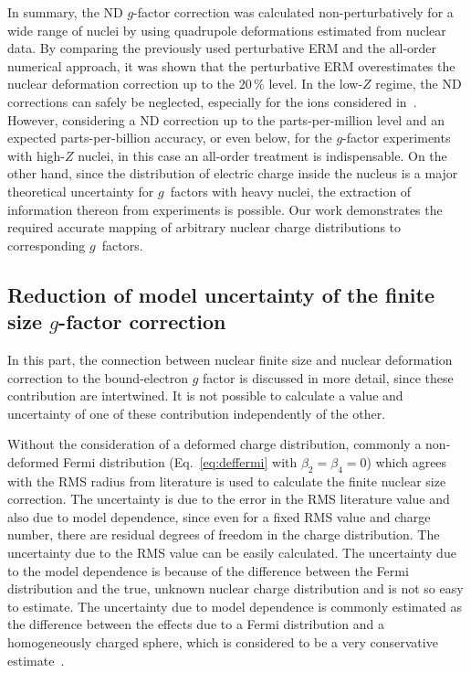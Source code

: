 In summary, the ND $g$-factor correction was calculated non-perturbatively for a wide range of nuclei by using quadrupole deformations estimated from nuclear data.
By comparing the previously used perturbative ERM and the all-order numerical approach, it was shown that the perturbative ERM overestimates the nuclear deformation correction up to the $20\,\%$ level.
In the low-$Z$ regime, the ND corrections can safely be neglected, especially for the ions considered in~\cite{Sturm2014}. However, considering a ND correction up to the parts-per-million level and an expected parts-per-billion accuracy, or even below, for the $g$-factor experiments with high-$Z$ nuclei, in this case an all-order treatment is indispensable. 
On the other hand, since the distribution of electric charge inside the nucleus is a major theoretical uncertainty for $g$~factors with heavy nuclei, the extraction of information thereon from experiments is possible. Our work demonstrates the required accurate mapping of arbitrary nuclear charge distributions to corresponding $g$~factors.\\[0.6cm]

\subsection{Reduction of model uncertainty of the finite size $g$-factor correction}
In this part, the connection between nuclear finite size and nuclear deformation correction to the bound-electron $g$ factor is discussed in more detail, since these contribution are intertwined. It is not possible to calculate a value and uncertainty of one of these contribution independently of the other.

Without the consideration of a deformed charge distribution, commonly a non-deformed Fermi distribution (Eq.~\eqref{eq:deffermi} with ${\beta_2}{=}{\beta_4}{=}0$) which agrees with the RMS radius from literature is used to calculate the finite nuclear size correction. 
The uncertainty is due to the error in the RMS literature value and also due to model dependence, since even for a fixed RMS value and charge number, there are residual degrees of freedom in the charge distribution. The uncertainty due to the RMS value can be easily calculated. The uncertainty due to the model dependence is because of the difference between the Fermi distribution and the true, unknown nuclear charge distribution and is not so easy to estimate. The uncertainty due to model dependence is commonly estimated as the difference between the effects due to a Fermi distribution and a homogeneously charged sphere, which is considered to be a very conservative estimate~\cite{Shabaev2006}.

